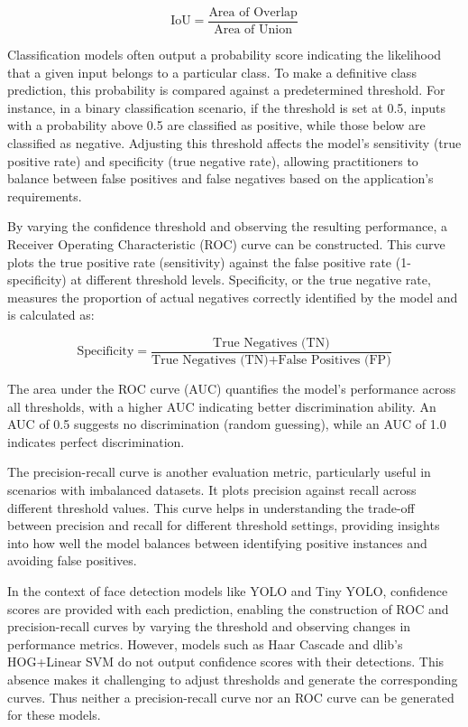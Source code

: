 \[
\text{IoU} = \frac{\text{Area of Overlap}}{\text{Area of Union}}
\]

Classification models often output a probability score indicating the likelihood that a given input belongs to a particular class. To make a definitive class prediction, this probability is compared against a predetermined threshold. For instance, in a binary classification scenario, if the threshold is set at 0.5, inputs with a probability above 0.5 are classified as positive, while those below are classified as negative. Adjusting this threshold affects the model's sensitivity (true positive rate) and specificity (true negative rate), allowing practitioners to balance between false positives and false negatives based on the application's requirements.

By varying the confidence threshold and observing the resulting performance, a Receiver Operating Characteristic (ROC) curve can be constructed. This curve plots the true positive rate (sensitivity) against the false positive rate (1-specificity) at different threshold levels. Specificity, or the true negative rate, measures the proportion of actual negatives correctly identified by the model and is calculated as:

\[
\text{Specificity} = \frac{\text{True Negatives (TN)}}{\text{True Negatives (TN)} + \text{False Positives (FP)}}
\]

The area under the ROC curve (AUC) quantifies the model's performance across all thresholds, with a higher AUC indicating better discrimination ability. An AUC of 0.5 suggests no discrimination (random guessing), while an AUC of 1.0 indicates perfect discrimination.

The precision-recall curve is another evaluation metric, particularly useful in scenarios with imbalanced datasets. It plots precision against recall across different threshold values. This curve helps in understanding the trade-off between precision and recall for different threshold settings, providing insights into how well the model balances between identifying positive instances and avoiding false positives.

In the context of face detection models like YOLO and Tiny YOLO, confidence scores are provided with each prediction, enabling the construction of ROC and precision-recall curves by varying the threshold and observing changes in performance metrics. However, models such as Haar Cascade and dlib's HOG+Linear SVM do not output confidence scores with their detections. This absence makes it challenging to adjust thresholds and generate the corresponding curves. Thus neither a precision-recall curve nor an ROC curve can be generated for these models.

